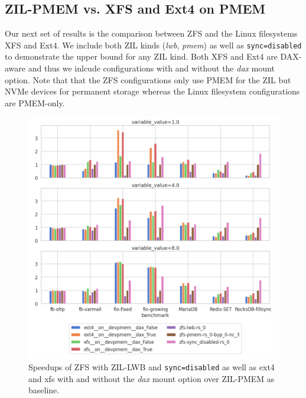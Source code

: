 \documentclass[12pt,a4paper,twoside]{book}
\begin{document}
\subsection{ZIL-PMEM vs. XFS and Ext4 on PMEM}

Our next set of results is the comparison between ZFS and the Linux filesystems XFS and Ext4.
We include both ZIL kinds (\textit{lwb}, \textit{pmem}) as well as \lstinline{sync=disabled} to demonstrate the upper bound for any ZIL kind.
Both XFS and Ext4 are DAX-aware and thus we inlcude configurations with and without the \textit{dax} mount option.
Note that that the ZFS configurations only use PMEM for the ZIL but NVMe devices for permanent storage whereas the Linux filesystem configurations are PMEM-only.

\begin{figure}[H]
    \centering
    \includegraphics[width=\textwidth]{fig/evaluation/app_benchmarks__filesystems}
    \caption{
        Speedups of ZFS with ZIL-LWB and \lstinline{sync=disabled} as well as ext4 and xfs with and without the \textit{dax} mount option over ZIL-PMEM as baseline.
    }
\end{figure}
\end{document}
